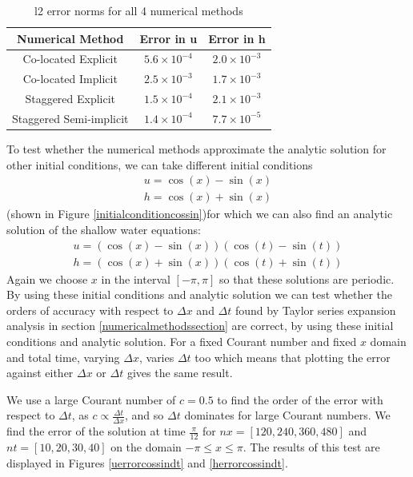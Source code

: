 \documentclass[a4paper, 10.8pt, notitlepage]{article}
\begin{document}
\begin{table}[H]
	\centering
	\begin{tabular}{|c | c| c|} 
		\hline
		\textbf{Numerical Method} & \textbf{Error in u} & \textbf{Error in h}  \\
		\hline
		Co-located Explicit & $5.6 \times 10^{-4}$ & $2.0 \times 10^{-3}$\\ 
		\hline
		Co-located  Implicit & $2.5 \times 10^{-3}$ & $1.7 \times 10^{-3}$ \\
		\hline
		Staggered Explicit &  $1.5 \times 10^{-4}$ & $2.1 \times 10^{-3}$\\
		\hline
		Staggered Semi-implicit & $1.4 \times 10^{-4}$ & $7.7\times 10 ^{-5}$ \\
		\hline
	\end{tabular}
	\caption{l2 error norms for all 4 numerical methods}
	\label{errortable}
\end{table}

To test whether the numerical methods approximate the analytic solution for other initial conditions, we can take different initial conditions
\begin{eqnarray} \label{ic}
u  =  \cos(x) - \sin(x)\\
 h  =  \cos(x) + \sin(x)
\end{eqnarray}
(shown in Figure \ref{initialconditioncossin})for which we can also find an analytic solution of the shallow water equations:
\begin{eqnarray} \label{as}
u = (\cos(x) - \sin(x))(\cos(t) - \sin(t))\\
h = (\cos(x) + \sin(x))(\cos(t) + \sin(t))
\end{eqnarray}
Again we choose $x$ in the interval $[-\pi, \pi]$ so that these solutions are periodic. By using these initial conditions and analytic solution we can test whether the orders of accuracy with respect to $\Delta x$ and $\Delta t$ found by Taylor series expansion analysis in section \ref{numericalmethodssection} are correct, by using these initial conditions and analytic solution. For a fixed Courant number and fixed $x$ domain and total time, varying $\Delta x$, varies $\Delta t$ too which means that plotting the error against either $\Delta x$ or $\Delta t$ gives the same result.  

We use a large Courant number of $c = 0.5$ to find the order of the error with respect to $\Delta t$, as $c \propto \frac{\Delta t}{\Delta x}$, and so $\Delta t$ dominates for large Courant numbers. We find the error of the solution at time $\frac{\pi}{12}$ for $nx = [120, 240, 360, 480]$ and $nt = [10, 20, 30, 40]$ on the domain $-\pi \leq x \leq \pi$. The results of this test are displayed in Figures \ref{uerrorcossindt} and \ref{herrorcossindt}.
\end{document}
